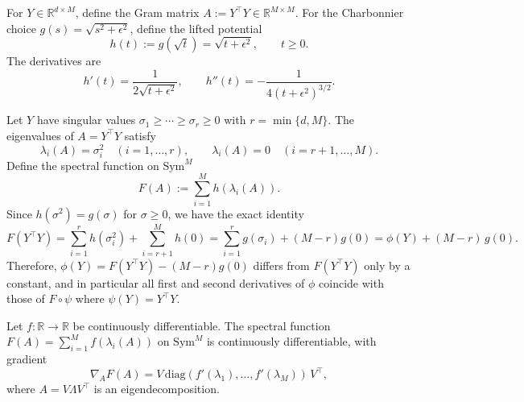 \begin{definition}
For $Y \in \mathbb{R}^{d \times M}$, define the Gram matrix $A := Y^\top Y \in \mathbb{R}^{M \times M}$.  For the Charbonnier choice $g(s)=\sqrt{s^2+\epsilon^2}$, define the lifted potential
\begin{equation}
h(t) := g(\sqrt{t}) = \sqrt{t + \epsilon^2}, \qquad t \geq 0.
\end{equation}
The derivatives are
\begin{equation}
h'(t) = \frac{1}{2\sqrt{t + \epsilon^2}}, \qquad h''(t) = -\frac{1}{4(t + \epsilon^2)^{3/2}}.
\end{equation}
\end{definition}

Let $Y$ have singular values $\sigma_1\geq\cdots\geq\sigma_r\geq 0$ with $r=\min\{d,M\}$.  The eigenvalues of $A=Y^\top Y$ satisfy
\begin{equation}
\lambda_i(A)=\sigma_i^2 \quad (i=1,\ldots,r), \qquad \lambda_i(A)=0 \quad (i=r+1,\ldots,M).
\end{equation}
Define the spectral function on $\mathrm{Sym}^M$
\begin{equation}
F(A) := \sum_{i=1}^{M} h(\lambda_i(A)).
\end{equation}
Since $h(\sigma^2)=g(\sigma)$ for $\sigma\geq 0$, we have the exact identity
\begin{equation}
F(Y^\top Y)=\sum_{i=1}^{r} h(\sigma_i^2) + \sum_{i=r+1}^{M} h(0)
= \sum_{i=1}^{r} g(\sigma_i) + (M-r) g(0)
= \phi(Y) + (M-r)\,g(0).
\label{eq:phi_F_const}
\end{equation}
Therefore, $\phi(Y)=F(Y^\top Y) - (M-r)g(0)$ differs from $F(Y^\top Y)$ only by a constant, and in particular all first and second derivatives of $\phi$ coincide with those of $F\circ\psi$ where $\psi(Y)=Y^\top Y$.

\begin{theorem}
\label{thm:lewis}
Let $f: \mathbb{R} \to \mathbb{R}$ be continuously differentiable. The spectral function $F(A) = \sum_{i=1}^{M} f(\lambda_i(A))$ on $\mathrm{Sym}^M$ is continuously differentiable, with gradient
\begin{equation}
\nabla_A F(A) = V \, \mathrm{diag}(f'(\lambda_1), \ldots, f'(\lambda_M)) \, V^\top,
\end{equation}
where $A = V \Lambda V^\top$ is an eigendecomposition.
\end{theorem}

